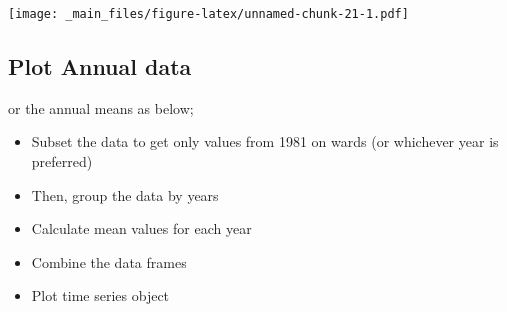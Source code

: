 \documentclass[
]{book}
\providecommand{\tightlist}{%
  \setlength{\itemsep}{0pt}\setlength{\parskip}{0pt}}
\begin{document}
\texttt{[image: \_main\_files/figure-latex/unnamed-chunk-21-1.pdf]}

\hypertarget{plot-annual-data}{%
\subsection{Plot Annual data}\label{plot-annual-data}}

or the annual means as below;

\begin{itemize}
\tightlist
\item
  Subset the data to get only values from 1981 on wards (or whichever year is preferred)
\item
  Then, group the data by years
\item
  Calculate mean values for each year
\item
  Combine the data frames
\item
  Plot time series object
\end{itemize}
\end{document}
